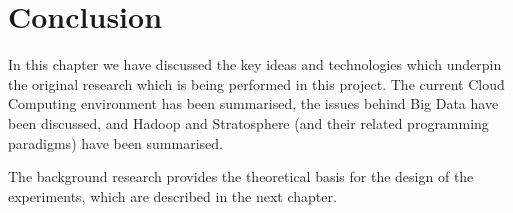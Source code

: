 

\section{Conclusion}
In this chapter we have discussed the key ideas and technologies which underpin the original research which is being performed in this project. The current Cloud Computing environment has been summarised, the issues behind Big Data have been discussed, and Hadoop and Stratosphere (and their related programming paradigms) have been summarised. 

The background research provides the theoretical basis for the design of the experiments, which are described in the next chapter. 
